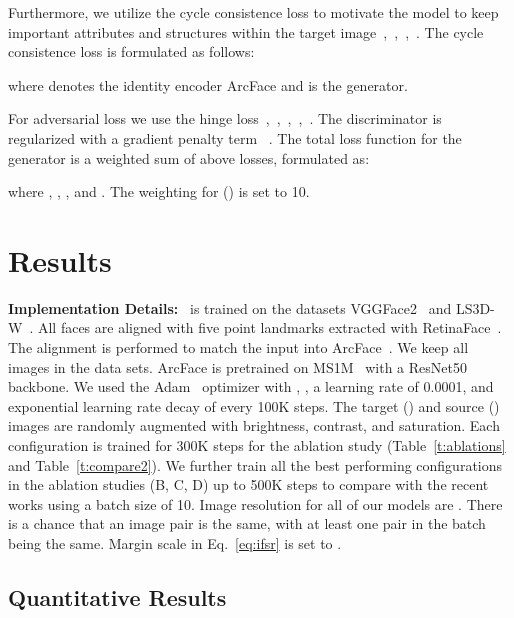 \documentclass[10pt,twocolumn,letterpaper]{article}
\newcommand{\fti}[1]{\textit{FaceDancer}{#1}}
\begin{document}
Furthermore, we utilize the cycle consistence loss to motivate the model to keep important attributes and structures within the target image~\cite{cyclegan},~\cite{discogan},~\cite{hififace},~\cite{stargan}. The cycle consistence loss is formulated as follows:



where  denotes the identity encoder ArcFace and  is the generator. 

For adversarial loss  we use the hinge loss~\cite{spade},~\cite{spectralnorm},~\cite{sagan},~\cite{biggan},~\cite{funit}. The discriminator is regularized with a gradient penalty term ~\cite{wgangp}. The total loss function for the generator  is a weighted sum of above losses, formulated as:



where , , ,  and . The weighting for  () is set to 10. 


\section{Results}
\textbf{Implementation Details:} \fti~is trained on the datasets VGGFace2~\cite{vggface2} and LS3D-W~\cite{ls3dw}. All faces are aligned with five point landmarks extracted with RetinaFace~\cite{retinaface}. The alignment is performed to match the input into ArcFace~\cite{arcface}. We keep all images in the data sets. ArcFace is pretrained on MS1M~\cite{ms1m} with a ResNet50 backbone. We used the Adam~\cite{adam} optimizer with , , a learning rate of 0.0001, and exponential learning rate decay of  every 100K steps. The target () and source () images are randomly augmented with brightness, contrast, and saturation.
Each configuration is trained for 300K steps for the ablation study (Table~\ref{t:ablations} and Table~\ref{t:compare2}). 
We further train   all the best performing configurations in the ablation studies (B, C, D) up to 500K steps to compare with the recent works using a batch size of 10.
Image resolution for all of our models are . There is a  chance that an image pair is the same, with at least one pair in the batch being the same. Margin scale  in Eq.~\ref{eq:ifsr} is set to .







\subsection{Quantitative Results}
\label{s:quant}
\end{document}
